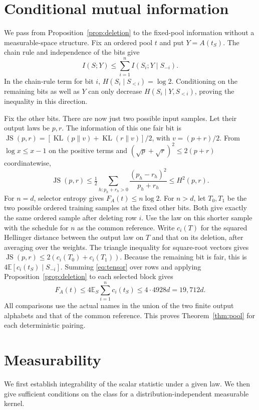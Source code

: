 \documentclass[11pt]{article}
\theoremstyle{definition}\newtheorem{definition}[theorem]{Definition}
\newcommand{\E}{\mathbb E}
\newcommand{\KL}{\operatorname{KL}}
\newcommand{\JS}{\operatorname{JS}}
\begin{document}
\section{Conditional mutual information}\label{sec:info}
We pass from Proposition~\ref{prop:deletion} to the fixed-pool information
without a measurable-space structure. Fix an ordered pool $t$ and put
$Y=A(t_S)$. The chain rule and independence of the bits give
\begin{equation}
 I(S;Y)\le \sum_{i=1}^n I(S_i;Y\mid S_{-i}).
 \label{eq:tensor}
\end{equation}
In the chain-rule term for bit $i$, $H(S_i\mid S_{<i})=\log2$.
Conditioning on the remaining bits as well as $Y$ can only decrease
$H(S_i\mid Y,S_{<i})$, proving the inequality in this direction.

Fix the other bits. There are now just two possible input samples. Let their
output laws be $p,r$. The information of this one fair bit is
$\JS(p,r)=[\KL(p\|v)+\KL(r\|v)]/2$, with $v=(p+r)/2$. From
$\log x\le x-1$ on the positive terms and
$(\sqrt p+\sqrt r)^2\le2(p+r)$ coordinatewise,
\[
 \JS(p,r)\le\tfrac12\sum_{h:p_h+r_h>0}\frac{(p_h-r_h)^2}{p_h+r_h}
             \le H^2(p,r).
\]
For $n=d$, selector entropy gives $F_A(t)\le n\log2$. For $n>d$, let
$T_0,T_1$ be the two possible ordered training samples at the fixed other
bits. Both give exactly the same ordered sample after deleting row $i$.
Use the law on this shorter sample with the schedule for $n$ as the
common reference. Write $c_i(T)$ for the squared Hellinger distance
between the output law on $T$ and that on its deletion, after averaging
over the weights. The triangle inequality for square-root vectors gives
$\JS(p,r)\le2(c_i(T_0)+c_i(T_1))$. Because the remaining bit is fair,
this is $4\E[c_i(t_S)\mid S_{-i}]$. Summing \eqref{eq:tensor} over rows
and applying Proposition~\ref{prop:deletion} to each selected block gives
\[
 F_A(t)\le4\E_S\sum_{i=1}^n c_i(t_S)\le4\cdot4928d=19{,}712d.
\]
All comparisons use the actual names in the union of the two finite
output alphabets and that of the common reference. This proves
Theorem~\ref{thm:pool} for each deterministic pairing.

\section{Measurability}\label{sec:scope}
We first establish integrability of the scalar statistic under a given law.
We then give sufficient conditions on the class for a distribution-independent
measurable kernel.
\end{document}
